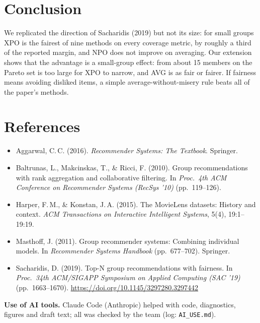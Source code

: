 \documentclass[11pt,a4paper]{article}
\newcommand{\npo}{NPO}
\newcommand{\xpo}{XPO}
\begin{document}
\section{Conclusion}

We replicated the direction of Sacharidis (2019) but not its size: for small
groups \xpo{} is the fairest of nine methods on every coverage metric, by
roughly a third of the reported margin, and \npo{} does not improve on
averaging. Our extension shows that the advantage is a small-group effect: from
about 15 members on the Pareto set is too large for \xpo{} to narrow, and AVG is
as fair or fairer. If fairness means avoiding disliked items, a simple
average-without-misery rule beats all of the paper's methods.

\small
\section*{References}\vspace{-0.4em}
\begin{itemize}
\renewcommand{\labelitemi}{}
\item Aggarwal, C.\,C. (2016). \emph{Recommender Systems: The Textbook}. Springer.
\item Baltrunas, L., Makcinskas, T., \& Ricci, F. (2010). Group recommendations with rank aggregation and collaborative filtering. In \emph{Proc.\ 4th ACM Conference on Recommender Systems (RecSys '10)} (pp.\ 119--126).
\item Harper, F.\,M., \& Konstan, J.\,A. (2015). The MovieLens datasets: History and context. \emph{ACM Transactions on Interactive Intelligent Systems}, 5(4), 19:1--19:19.
\item Masthoff, J. (2011). Group recommender systems: Combining individual models. In \emph{Recommender Systems Handbook} (pp.\ 677--702). Springer.
\item Sacharidis, D. (2019). Top-N group recommendations with fairness. In \emph{Proc.\ 34th ACM/SIGAPP Symposium on Applied Computing (SAC '19)} (pp.\ 1663--1670). \url{https://doi.org/10.1145/3297280.3297442}
\end{itemize}

\textbf{Use of AI tools.} Claude Code (Anthropic) helped with code, diagnostics,
figures and draft text; all was checked by the team (log: \texttt{AI\_USE.md}).

\clearpage
\normalsize
\appendix
\end{document}

